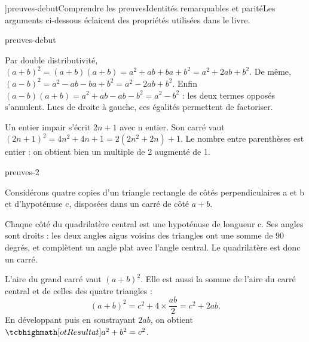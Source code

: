\editionPage[\pdfbookmark[0]{Démonstrations}{bm-preuves-debut-parent}]{preuves-debut}{Comprendre les preuves}{Identités remarquables et parité}{Les arguments ci-dessous éclairent des propriétés utilisées dans le livre.}
\begin{blocEdition}{preuves-debut}

\begin{demonstration}
Par double distributivité, $(a+b)^2=(a+b)(a+b)=a^2+ab+ba+b^2=a^2+2ab+b^2$.
De même, $(a-b)^2=a^2-ab-ba+b^2=a^2-2ab+b^2$. Enfin
$(a-b)(a+b)=a^2+ab-ab-b^2=a^2-b^2$ : les deux termes opposés s’annulent.
Lues de droite à gauche, ces égalités permettent de factoriser.
\end{demonstration}
\begin{demonstration}
Un entier impair s’écrit $2n+1$ avec n entier. Son carré vaut
$(2n+1)^2=4n^2+4n+1=2(2n^2+2n)+1$. Le nombre entre parenthèses est entier :
on obtient bien un multiple de 2 augmenté de 1.
\end{demonstration}

\end{blocEdition}
\begin{blocEdition}{preuves-2}

Considérons quatre copies d’un triangle rectangle de côtés perpendiculaires
a et b et d’hypoténuse c, disposées dans un carré de côté $a+b$.
\begin{center}\end{center}
Chaque côté du quadrilatère central est une hypoténuse de longueur c.
Ses angles sont droits : les deux angles aigus voisins des triangles
ont une somme de 90 degrés, et complètent un angle plat avec l’angle central.
Le quadrilatère est donc un carré.\par\medskip
L’aire du grand carré vaut $(a+b)^2$. Elle est aussi la somme de l’aire
du carré central et de celles des quatre triangles :
\[
(a+b)^2=c^2+4\times\frac{ab}{2}=c^2+2ab.
\]
En développant puis en soustrayant $2ab$, on obtient
$\res{a^2+b^2=c^2}$.

\end{blocEdition}

